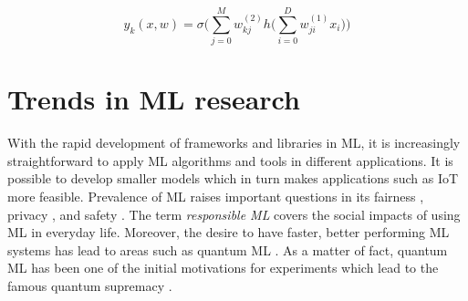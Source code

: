 \[
y_{k}(x,w)=\sigma\bigg(\sum_{j=0}^{M}w^{(2)}_{kj}h \bigg( \sum_{i=0}^{D}w_{ji}^{(1)}x_i \bigg)\bigg)
\]


\section{Trends in ML research}
With the rapid development of frameworks and libraries in ML, it is increasingly straightforward to apply ML algorithms and tools in different applications. It is possible to develop smaller models which in turn makes applications such as IoT \cite{iot_apps_conf} more feasible. 
Prevalence of ML raises important questions in its fairness \cite{FairML2018}, privacy \cite{Federated2019}, and safety \cite{Varshney2017}. The term \textit{responsible ML} covers the social impacts of using ML in everyday life.
Moreover, the desire to have faster, better performing ML systems has lead to areas such as quantum ML \cite{QuantumML2017}. As a matter of fact, quantum ML has been one of the initial motivations for experiments which lead to the famous quantum supremacy \cite{Quantum_sup}.